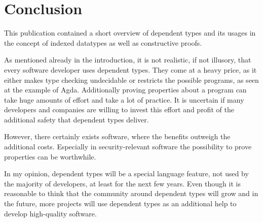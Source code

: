 \section{Conclusion}
This publication contained a short overview of dependent types and its usages in the concept of indexed datatypes as well as constructive proofs.

As mentioned already in the introduction, it is not realistic, if not illusory, that every software developer uses dependent types. 
They come at a heavy price, as it either makes type checking undecidable or restricts the possible programs, as seen at the example of Agda.
Additionally proving properties about a program can take huge amounts of effort and take a lot of practice.
It is uncertain if many developers and companies are willing to invest this effort and profit of the additional safety that dependent types deliver.

However, there certainly exists software, where the benefits outweigh the additional costs. 
Especially in security-relevant software the possibility to prove properties can be worthwhile.

In my opinion, dependent types will be a special language feature, not used by the majority of developers, at least for the next few years. 
Even though it is reasonable to think that the community around dependent types will grow and in the future, more projects will use dependent types as an additional help to develop high-quality software.